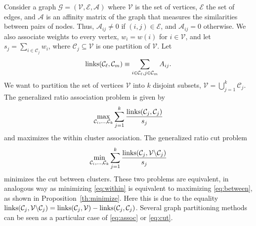 \documentclass[aps,preprint,nofootinbib,floatfix]{revtex4-1}
\newcommand\C{{\mathcal{C}}}
\begin{document}
Consider a graph $\mathcal{G} = (\mathcal{V}, \mathcal{E}, \mathcal{A})$
where $\mathcal{V}$ is the set of vertices, $\mathcal{E}$ the set of edges,
and $\mathcal{A}$ is an affinity matrix of the graph 
that measures the 
similarities between pairs of nodes. Thus, $\mathcal{A}_{ij} \ne 0$
if $(i,j) \in \mathcal{E}$, and $\mathcal{A}_{ij} = 0$ otherwise.
We also associate weights to every vertex, 
$w_i = w(i)$ for $i \in \mathcal{V}$, and let $s_j = \sum_{ i \in \C_j} w_i$,
where $\C_j \subseteq \mathcal{V}$ is one partition of $\mathcal{V}$.
Let
\begin{equation}
\textnormal{links}(\C_\ell, \C_m) \equiv 
\sum_{i\in \C_\ell, j\in \C_m } A_{ij} .
\end{equation}
We want to partition the set of vertices $\mathcal{V}$ into $k$ disjoint
subsets, $\mathcal{V} = \bigcup_{j=1}^k \C_j $. 
The generalized ratio association problem is given by
\begin{equation}
\label{eq:assoc}
\max_{\C_i,\dots,\C_k} \sum_{j=1}^k \dfrac{\textnormal{links}(\C_j,\C_j)}{s_j}
\end{equation}
and maximizes the within cluster association.
The generalized ratio cut problem
\begin{equation}
\label{eq:cut}
\min_{\C_i,\dots,\C_k} \sum_{j=1}^k
\dfrac{\textnormal{links}(\C_j,\mathcal{V} \backslash \C_j)}{s_j}
\end{equation}
minimizes the cut between clusters. These two problems are equivalent,
in analogous way as minimizing \eqref{eq:within} is equivalent to
maximizing \eqref{eq:between}, as shown in Proposition~\ref{th:minimize}.
Here this is due to the equality
$\textnormal{links}(\C_j,\mathcal{V} \backslash \C_j)=
\textnormal{links}(\C_j,\mathcal{V}) - \textnormal{links}(\C_j,\C_j)$.
Several graph partitioning methods 
\cite{Kernighan,Malik,Chan,Yu}
can be seen as a particular case of \eqref{eq:assoc} or \eqref{eq:cut}.
\end{document}
